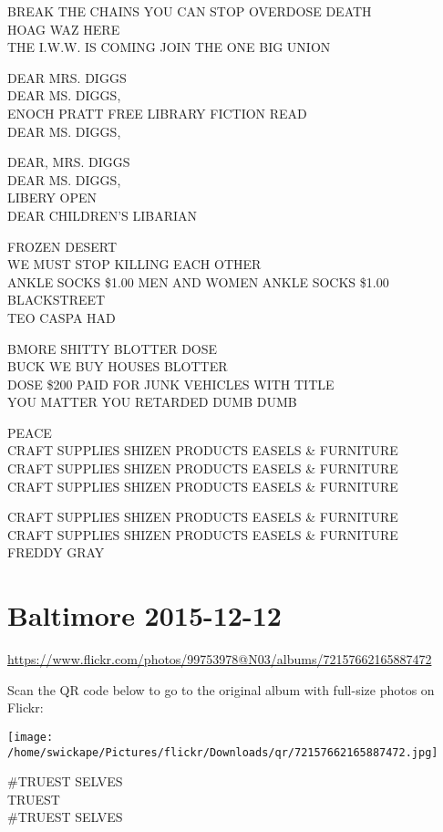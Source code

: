 \documentclass[10pt,letterpaper]{article}
\begin{document}
BREAK THE CHAINS YOU CAN STOP OVERDOSE DEATH\\
HOAG WAZ HERE\\
THE I.W.W. IS COMING JOIN THE ONE BIG UNION

DEAR MRS. DIGGS\\
DEAR MS. DIGGS,\\
ENOCH PRATT FREE LIBRARY FICTION READ\\
DEAR MS. DIGGS,

DEAR, MRS. DIGGS\\
DEAR MS. DIGGS,\\
LIBERY OPEN\\
DEAR CHILDREN'S LIBARIAN

FROZEN DESERT\\
WE MUST STOP KILLING EACH OTHER\\
ANKLE SOCKS \$1.00 MEN AND WOMEN ANKLE SOCKS \$1.00 BLACKSTREET\\
TEO CASPA HAD

BMORE SHITTY BLOTTER DOSE\\
BUCK WE BUY HOUSES BLOTTER\\
DOSE \$200 PAID FOR JUNK VEHICLES WITH TITLE\\
YOU MATTER YOU RETARDED DUMB DUMB

PEACE\\
CRAFT SUPPLIES SHIZEN PRODUCTS EASELS \& FURNITURE\\
CRAFT SUPPLIES SHIZEN PRODUCTS EASELS \& FURNITURE\\
CRAFT SUPPLIES SHIZEN PRODUCTS EASELS \& FURNITURE

CRAFT SUPPLIES SHIZEN PRODUCTS EASELS \& FURNITURE\\
CRAFT SUPPLIES SHIZEN PRODUCTS EASELS \& FURNITURE\\
FREDDY GRAY


\section*{Baltimore 2015-12-12}

\url{https://www.flickr.com/photos/99753978@N03/albums/72157662165887472}

Scan the QR code below to go to the original album with full-size photos on Flickr:

\texttt{[image: /home/swickape/Pictures/flickr/Downloads/qr/72157662165887472.jpg]}


\#TRUEST SELVES\\
TRUEST\\
\#TRUEST SELVES
\end{document}
